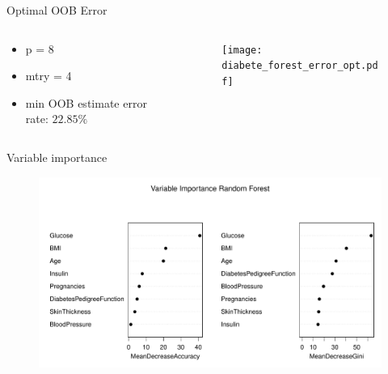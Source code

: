 
\begin{frame}{Optimal OOB Error}

\begin{columns}
\begin{column}{0.35\textwidth}
{\footnotesize \begin{itemize}
    \item p = 8
    \item mtry = 4 
    \item min OOB estimate error rate: $22.85\%$
\end{itemize}}

\end{column}
\begin{column}{0.75\textwidth}
\begin{figure}
\texttt{[image: diabete\_forest\_error\_opt.pdf]}
\end{figure}
\end{column}
\end{columns}

\end{frame}


\begin{frame}{Variable importance}

\begin{figure}
	\hspace*{-2.5em}\includegraphics[width=1.15\textwidth,trim=0 0 0 1.5cm,clip]{./Figures/diabete_var_imp.pdf}
\end{figure}

\end{frame}
